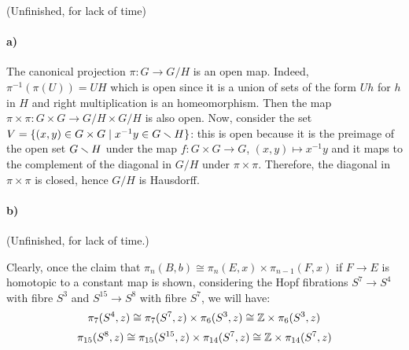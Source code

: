 \documentclass[a4paper,11pt,english]{article}
\begin{document}
\begin{exercise}[2](Unfinished, for lack of time)

\paragraph{a)} The canonical projection $\pi:G\to G/H$ is an open map. Indeed, $\pi^{-1}(\pi(U))=UH$ which is open since it is a union of sets of the form $Uh$ for $h$ in $H$ and right multiplication is an homeomorphism. Then the map $\pi\times\pi:G\times G\to G/H\times G/H$ is also open. Now, consider the set $V=\{(x,y)\in G\times G\mid x^{-1}y\in G\smallsetminus H\}$: this is open because it is the preimage of the open set $G\smallsetminus H$ under the map $f:G\times G\to G$, $(x,y)\mapsto x^{-1}y$ and it maps to the complement of the diagonal in $G/H$ under $\pi\times\pi$. Therefore, the diagonal in $\pi\times\pi$ is closed, hence $G/H$ is Hausdorff.

\paragraph{b)}

\end{exercise}

\begin{exercise}[3](Unfinished, for lack of time.)

Clearly, once the claim that $\pi_n(B,b)\cong\pi_n(E,x)\times\pi_{n-1}(F,x)$ if $F\to E$ is homotopic to a constant map is shown, considering the Hopf fibrations $S^7\to S^4$ with fibre $S^3$ and $S^{15}\to S^8$ with fibre $S^7$, we will have: \[\pi_7(S^4,z)\cong\pi_7(S^7,z)\times\pi_6(S^3,z)\cong\mathbb{Z}\times\pi_6(S^3,z)\]
\[\pi_{15}(S^8,z)\cong\pi_{15}(S^{15},z)\times\pi_{14}(S^7,z)\cong\mathbb{Z}\times\pi_{14}(S^7,z)\]

\end{exercise}
\end{document}
